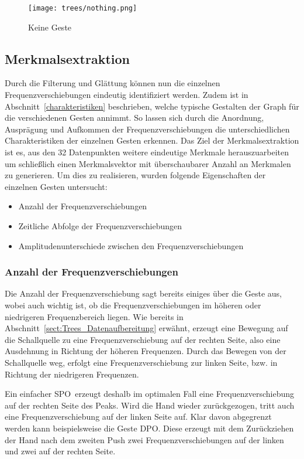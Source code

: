 \begin{figure}[htbp] \centering
\texttt{[image: trees/nothing.png]}
\caption{Keine Geste}
\label{fig:nothing}
\end{figure}

\subsection{Merkmalsextraktion}
Durch die Filterung und Glättung können nun die einzelnen Frequenzverschiebungen eindeutig identifiziert werden. Zudem ist in Abschnitt~\ref{charakteristiken} beschrieben, welche typische Gestalten der Graph für die verschiedenen Gesten annimmt. So lassen sich durch die Anordnung, Ausprägung und Aufkommen der Frequenzverschiebungen die unterschiedlichen Charakteristiken der einzelnen Gesten erkennen. Das Ziel der Merkmalsextraktion ist es, aus den 32 Datenpunkten weitere eindeutige Merkmale herauszuarbeiten um schließlich einen Merkmalsvektor mit überschaubarer Anzahl an Merkmalen zu generieren. Um dies zu realisieren, wurden folgende Eigenschaften der einzelnen Gesten untersucht:

\begin{itemize} 
\item Anzahl der Frequenzverschiebungen
\item Zeitliche Abfolge der Frequenzverschiebungen
\item Amplitudenunterschiede zwischen den Frequenzverschiebungen
\end{itemize}

\subsubsection*{Anzahl der Frequenzverschiebungen}
Die Anzahl der Frequenzverschiebung sagt bereits einiges über die Geste aus, wobei auch wichtig ist, ob die Frequenzverschiebungen im höheren oder niedrigeren Frequenzbereich liegen. Wie bereits in Abschnitt~\ref{sect:Trees_Datenaufbereitung} erwähnt, erzeugt eine Bewegung auf die Schallquelle zu eine Frequenzverschiebung auf der rechten Seite, also eine Ausdehnung in Richtung der höheren Frequenzen. Durch das Bewegen von der Schallquelle weg, erfolgt eine Frequenzverschiebung zur linken Seite, bzw. in Richtung der niedrigeren Frequenzen. 

Ein einfacher \glqq \acl{SPO}\grqq\ erzeugt deshalb im optimalen Fall eine Frequenzverschiebung auf der rechten Seite des Peaks. Wird die Hand wieder zurückgezogen, tritt auch eine Frequenzverschiebung auf der linken Seite auf. Klar davon abgegrenzt werden kann beispielsweise die Geste \glqq \acl{DPO}\grqq. Diese erzeugt mit dem Zurückziehen der Hand nach dem zweiten Push zwei Frequenzverschiebungen auf der linken und zwei auf der rechten Seite.

